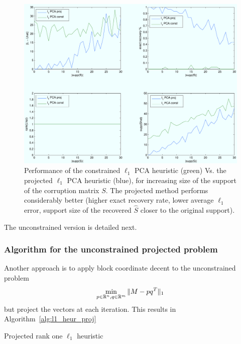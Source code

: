 \begin{figure}[h!]
\centering
\includegraphics[width=\textwidth]{../figures/l1pca_proj_vs_const.pdf}
\caption{Performance of the constrained $\ell_1$ PCA heuristic (green) Vs. the projected $\ell_1$ PCA heuristic (blue), for increasing size of the support of the corruption matrix $S$. The projected method performs considerably better (higher exact recovery rate, lower average $\ell_1$ error, support size of the recovered $\hat{S}$ closer to the original support).}
\label{fig:pca_const_vs_proj}
\end{figure}


\newpage
The unconstrained version is detailed next.

\subsubsection{Algorithm for the unconstrained projected problem} 
Another approach is to apply block coordinate decent to the unconstrained problem
\[
\begin{aligned}
\min_{p \in {\mathbb R}^n, q \in {\mathbb R}^m} \|M - pq^T\|_1
\end{aligned}
\]
but project the vectors at each iteration. This results in Algorithm~\ref{alg:l1_heur_proj}

\begin{algorithm}[h]
\caption{Projected rank one $\ell_1$ heuristic}
\label{alg:l1_heur_proj}
\end{algorithm}

